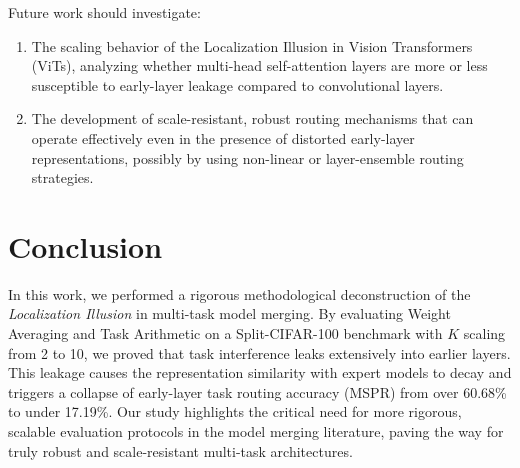 \documentclass{article}
\theoremstyle{plain}
\theoremstyle{definition}
\theoremstyle{remark}
\begin{document}
Future work should investigate:
\begin{enumerate}
    \item The scaling behavior of the Localization Illusion in Vision Transformers (ViTs), analyzing whether multi-head self-attention layers are more or less susceptible to early-layer leakage compared to convolutional layers.
    \item The development of scale-resistant, robust routing mechanisms that can operate effectively even in the presence of distorted early-layer representations, possibly by using non-linear or layer-ensemble routing strategies.
\end{enumerate}

\section{Conclusion}
In this work, we performed a rigorous methodological deconstruction of the \emph{Localization Illusion} in multi-task model merging. By evaluating Weight Averaging and Task Arithmetic on a Split-CIFAR-100 benchmark with $K$ scaling from 2 to 10, we proved that task interference leaks extensively into earlier layers. This leakage causes the representation similarity with expert models to decay and triggers a collapse of early-layer task routing accuracy (MSPR) from over 60.68\% to under 17.19\%. Our study highlights the critical need for more rigorous, scalable evaluation protocols in the model merging literature, paving the way for truly robust and scale-resistant multi-task architectures.

\clearpage


\end{document}
